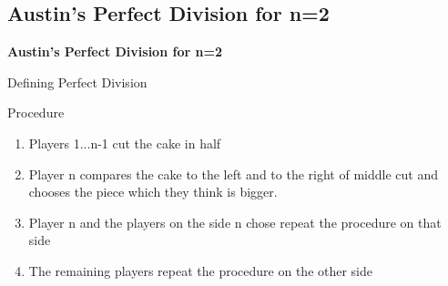\documentclass[aspectratio=169,xcolor=dvipsnames]{beamer}
\begin{document}
\subsection{Austin's Perfect Division for n=2}
\begin{frame}
	\Huge{\centerline{\textbf{Austin's Perfect Division for n=2}}}
\end{frame}
\begin{frame}{Defining Perfect Division}
	
\end{frame}
\begin{frame}{Procedure}
	\begin{enumerate}
		\item Players 1...n-1 cut the cake in half
		\item Player n compares the cake to the left and to the right of middle cut and chooses the piece which they think is bigger.\pause
		\item Player n and the players on the side n chose repeat the procedure on that side
		\item The remaining players repeat the procedure on the other side
	\end{enumerate}
\end{frame}
\end{document}
